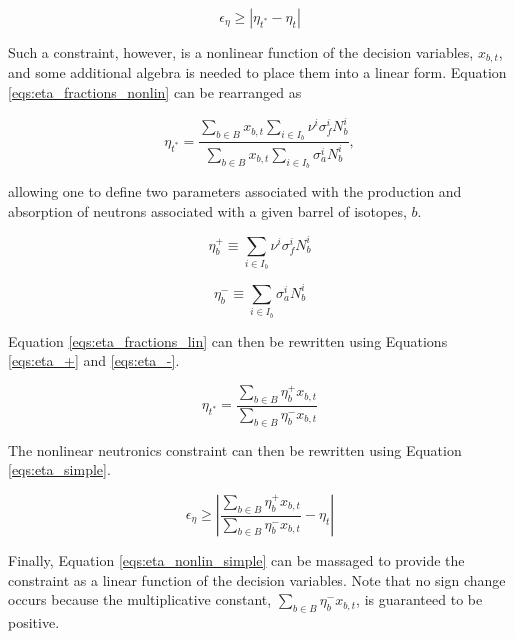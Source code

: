 \begin{equation}\label{eqs:eta-constraint-nonlin}
\epsilon_{\eta} \geq \left| \eta_{t^*} - \eta_t \right|
\end{equation}

Such a constraint, however, is a nonlinear function of the decision variables,
$x_{b,t}$, and some additional algebra is needed to place them into a linear
form. Equation \ref{eqs:eta_fractions_nonlin} can be rearranged as

\begin{equation}
\label{eqs:eta_fractions_lin}
\eta_{t^*} = \frac{\sum_{b \in B} x_{b, t} \sum_{i \in I_{b}} \nu^{i} \sigma_{f}^{i} N_{b}^{i}}
                {\sum_{b \in B} x_{b, t} \sum_{i \in I_{b}} \sigma_{a}^{i} N_{b}^{i}},
\end{equation}

allowing one to define two parameters associated with the production and
absorption of neutrons associated with a given barrel of isotopes, $b$.

\begin{equation}
\label{eqs:eta_+}
\eta_{b}^{+} \equiv \sum_{i \in I_{b}} \nu^{i} \sigma_{f}^{i} N_{b}^{i}
\end{equation}

\begin{equation}
\label{eqs:eta_-}
\eta_{b}^{-} \equiv \sum_{i \in I_{b}} \sigma_{a}^{i} N_{b}^{i}
\end{equation}

Equation \ref{eqs:eta_fractions_lin} can then be rewritten using Equations
\ref{eqs:eta_+} and \ref{eqs:eta_-}.

\begin{equation}
\label{eqs:eta_simple}
\eta_{t^*} = \frac{\sum_{b \in B} \eta_{b}^{+} x_{b, t}}
                {\sum_{b \in B} \eta_{b}^{-} x_{b, t}}
\end{equation}

The nonlinear neutronics constraint can then be rewritten using Equation
\ref{eqs:eta_simple}.

\begin{equation}
\label{eqs:eta_nonlin_simple}
\epsilon_{\eta} \geq \left| 
\frac{\sum_{b \in B} \eta_{b}^{+} x_{b,t}}
     {\sum_{b \in B} \eta_{b}^{-} x_{b,t}}
- \eta_{t} \right|
\end{equation}

Finally, Equation \ref{eqs:eta_nonlin_simple} can be massaged to provide the
constraint as a linear function of the decision variables. Note that no sign
change occurs because the multiplicative constant, $\sum_{b \in B} \eta_{b}^{-}
x_{b,t}$, is guaranteed to be positive.

